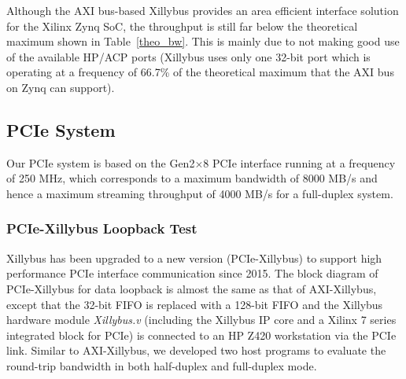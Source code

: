 \begin{table}[tb]
	\caption{Area overhead of AXI bus-based systems.}
	\label{xillybus_mxp_area}
	\centering
\end{table}

Although the AXI bus-based Xillybus provides an area efficient interface solution for the Xilinx Zynq SoC, the throughput is still far below the theoretical maximum shown in Table~\ref{theo_bw}. 
This is mainly due to not making good use of the available HP/ACP ports (Xillybus uses only one 32-bit port which is operating at a frequency of 66.7\% of the theoretical maximum that the AXI bus on Zynq can support). 


\subsection{PCIe System}
Our PCIe system is based on the Gen2$\times$8 PCIe interface running at a frequency of 250 MHz, which corresponds to a maximum bandwidth of 8000 MB/s and hence a maximum streaming throughput of 4000 MB/s for a full-duplex system. 

\subsubsection{PCIe-Xillybus Loopback Test}
Xillybus has been upgraded to a new version (PCIe-Xillybus) to support high performance PCIe interface communication since 2015. 
The block diagram of PCIe-Xillybus for data loopback is almost the same as that of AXI-Xillybus, except that the 32-bit FIFO is replaced with a 128-bit FIFO and the Xillybus hardware module \textit{Xillybus.v} (including the Xillybus IP core and a Xilinx 7 series integrated block for PCIe) is connected to an HP Z420 workstation via the PCIe link. 
Similar to AXI-Xillybus, we developed two host programs to evaluate the round-trip bandwidth in both half-duplex and full-duplex mode. 

